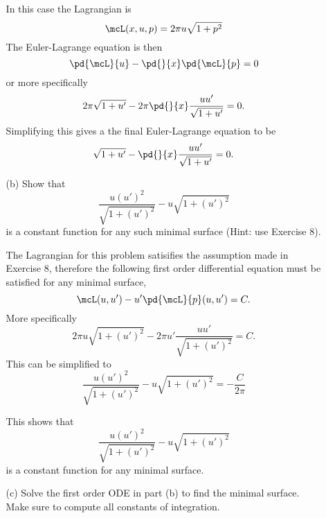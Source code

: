 \documentclass[11pt, oneside]{article}
\begin{document}
\begin{enumerate}
\begin{enumerate}
        In this case the Lagrangian is
        \[
          \mcL(x, u, p) = 2\pi u \sqrt{1 + p^2}
        \]
        The Euler-Lagrange equation is then
        \[
          \pd{\mcL}{u} - \pd{}{x} \pd{\mcL}{p} = 0
        \]
        or more specifically
        \[
          2\pi \sqrt{1 + u'} - 2\pi \pd{}{x} \frac{uu'}{\sqrt{1 + u'}} = 0.
        \]
        Simplifying this gives a the final Euler-Lagrange equation to be
        \[
          \sqrt{1 + u'} - \pd{}{x} \frac{uu'}{\sqrt{1 + u'}} = 0.
        \]

      \item[(b)] %
        Show that
        \[
          \frac{u(u')^2}{\sqrt{1 + (u')^2}} - u\sqrt{1 + (u')^2}
        \]
        is a constant function for any such minimal surface (Hint: use Exercise 8).

        The Lagrangian for this problem satisifies the assumption made in
        Exercise 8, therefore the following first order differential equation
        must be satisfied for any minimal surface,
        \[
          \mcL(u, u') - u' \pd{\mcL}{p}(u, u') = C.
        \]
        More specifically
        \[
          2\pi u\sqrt{1 + (u')^2} - 2\pi u' \frac{uu'}{\sqrt{1 + (u')^2}} = C.
        \]
        This can be simplified to 
        \[
          \frac{u(u')^2}{\sqrt{1 + (u')^2}} - u\sqrt{1 + (u')^2} = -\frac{C}{2\pi}
        \]

        This shows that
        \[
          \frac{u(u')^2}{\sqrt{1 + (u')^2}} - u\sqrt{1 + (u')^2}
        \]
        is a constant function for any minimal surface.

      \item[(c)]
        Solve the first order ODE in part (b) to find the minimal surface.
        Make sure to compute all constants of integration.


\end{enumerate}
\end{enumerate}
\end{document}
